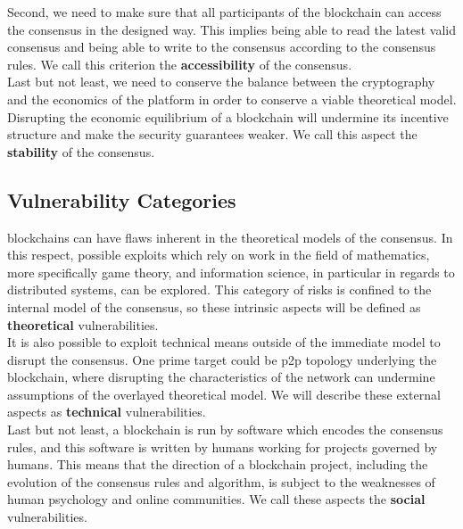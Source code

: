 \documentclass[12pt,a4paper]{article}
\begin{document}
Second, we need to make sure that all participants of the \gls{blockchain} can access the \gls{consensus} in the designed way. This implies being able to read the latest valid \gls{consensus} and being able to write to the \gls{consensus} according to the consensus rules. We call this criterion the \textbf{accessibility} of the \gls{consensus}.\\

Last but not least, we need to conserve the balance between the cryptography and the economics of the platform in order to conserve a viable theoretical model. Disrupting the economic equilibrium of a \gls{blockchain} will undermine its incentive structure and make the security guarantees weaker. We call this aspect the \textbf{stability} of the \gls{consensus}.\\

\subsection{Vulnerability Categories}

\Glspl{blockchain} can have flaws inherent in the theoretical models of the \gls{consensus}. In this respect, possible exploits which rely on work in the field of mathematics, more specifically game theory, and information science, in particular in regards to distributed systems, can be explored. This category of risks is confined to the internal model of the \gls{consensus}, so these intrinsic aspects will be defined as \textbf{theoretical} vulnerabilities.\\

It is also possible to exploit technical means outside of the immediate model to disrupt the \gls{consensus}. One prime target could be \acrfull{p2p} topology underlying the \gls{blockchain}, where disrupting the characteristics of the network can undermine assumptions of the overlayed theoretical model. We will describe these external aspects as \textbf{technical} vulnerabilities.\\

Last but not least, a \gls{blockchain} is run by software which encodes the consensus rules, and this software is written by humans working for projects governed by humans. This means that the direction of a blockchain project, including the evolution of the consensus rules and algorithm, is subject to the weaknesses of human psychology and online communities. We call these aspects the \textbf{social} vulnerabilities.\\
\end{document}
